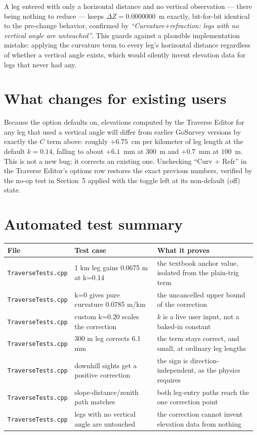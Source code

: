 \documentclass[11pt]{article}
\begin{document}
A leg entered with only a horizontal distance and no vertical
observation --- there being nothing to reduce --- keeps
$\Delta Z = 0.0000000$~m exactly, bit-for-bit identical to the pre-change
behavior, confirmed by \emph{``Curvature+refraction: legs with no vertical
angle are untouched''}. This guards against a plausible implementation
mistake: applying the curvature term to every leg's horizontal distance
regardless of whether a vertical angle exists, which would silently invent
elevation data for legs that never had any.

\section{What changes for existing users}

Because the option defaults on, elevations computed by the Traverse Editor
for any leg that used a vertical angle will differ from earlier GoSurvey
versions by exactly the $C$ term above: roughly $+6.75$~cm per kilometer of
leg length at the default $k=0.14$, falling to about $+6.1$~mm at
$300$~m and $+0.7$~mm at $100$~m. This is not a new bug; it corrects an
existing one. Unchecking ``Curv + Refr'' in the Traverse Editor's options
row restores the exact previous numbers, verified by the no-op test in
Section~5 applied with the toggle left at its non-default (off) state.

\section{Automated test summary}

\begin{center}
\small
\begin{tabular}{@{}L{0.27\textwidth}L{0.37\textwidth}L{0.28\textwidth}@{}}
\toprule
File & Test case & What it proves \\
\midrule
\texttt{TraverseTests.cpp} &
  1 km leg gains 0.0675 m at k=0.14 &
  the textbook anchor value, isolated from the plain-trig term \\[0.3em]
\texttt{TraverseTests.cpp} &
  k=0 gives pure curvature 0.0785 m/km &
  the uncancelled upper bound of the correction \\[0.3em]
\texttt{TraverseTests.cpp} &
  custom k=0.20 scales the correction &
  $k$ is a live user input, not a baked-in constant \\[0.3em]
\texttt{TraverseTests.cpp} &
  300 m leg corrects 6.1 mm &
  the term stays correct, and small, at ordinary leg lengths \\[0.3em]
\texttt{TraverseTests.cpp} &
  downhill sights get a positive correction &
  the sign is direction-independent, as the physics requires \\[0.3em]
\texttt{TraverseTests.cpp} &
  slope-distance/zenith path matches &
  both leg-entry paths reach the one correction point \\[0.3em]
\texttt{TraverseTests.cpp} &
  legs with no vertical angle are untouched &
  the correction cannot invent elevation data from nothing \\
\bottomrule
\end{tabular}
\end{center}
\end{document}
